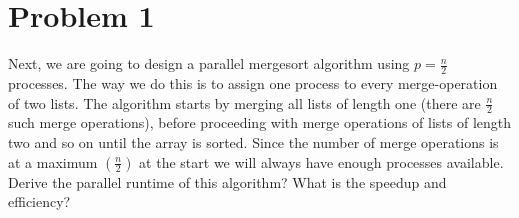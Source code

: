 \documentclass{article}
\begin{document}
    \section{Problem 1}


\medskip

\begin{center}
\end{center}
\medskip

Next, we are going to design a parallel mergesort algorithm using \( p = \frac{n}{2}  \) processes. The way we do this is to assign one process to every merge-operation of two lists. The algorithm starts by merging all lists of length one (there are \( \frac{n}{2}  \) such merge operations), before proceeding with merge operations of lists of length two and so on until the array is sorted. Since the number of merge operations is at a maximum \( \left( \frac{n}{2} \right)  \)  at the start we will always have enough processes available. Derive the parallel runtime of this algorithm? What is the speedup and efficiency?

\medskip
\end{document}
